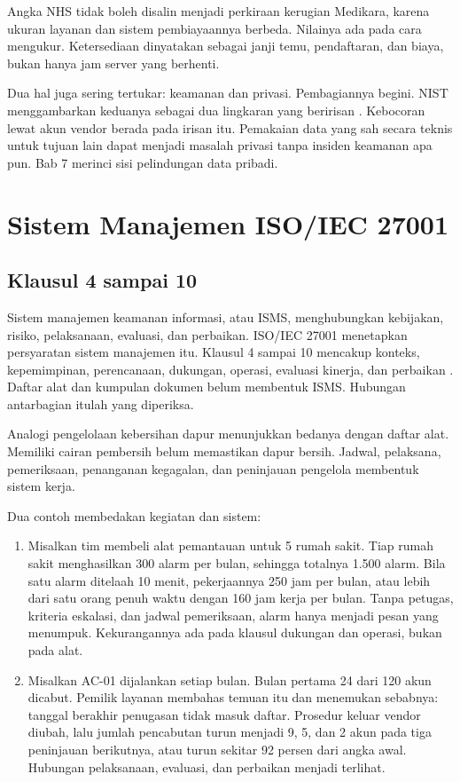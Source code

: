 Angka NHS tidak boleh disalin menjadi perkiraan kerugian Medikara, karena ukuran layanan dan sistem
pembiayaannya berbeda. Nilainya ada pada cara mengukur. Ketersediaan dinyatakan sebagai janji temu,
pendaftaran, dan biaya, bukan hanya jam server yang berhenti.

Dua hal juga sering tertukar: keamanan dan privasi. Pembagiannya begini. NIST menggambarkan
keduanya sebagai dua lingkaran yang beririsan \cite{nistcsf2}. Kebocoran lewat akun vendor berada
pada irisan itu. Pemakaian data yang sah secara teknis untuk tujuan lain dapat menjadi masalah
privasi tanpa insiden keamanan apa pun. Bab 7 merinci sisi pelindungan data pribadi.

\section{Sistem Manajemen ISO/IEC 27001}

\subsection*{Klausul 4 sampai 10}

Sistem manajemen keamanan informasi, atau ISMS, menghubungkan kebijakan, risiko, pelaksanaan,
evaluasi, dan perbaikan. ISO/IEC 27001 menetapkan persyaratan sistem manajemen itu. Klausul 4
sampai 10 mencakup konteks, kepemimpinan, perencanaan, dukungan, operasi, evaluasi kinerja, dan
perbaikan \cite{iso27001-2022}. Daftar alat dan kumpulan dokumen belum membentuk ISMS. Hubungan
antarbagian itulah yang diperiksa.

Analogi pengelolaan kebersihan dapur menunjukkan bedanya dengan daftar alat. Memiliki cairan
pembersih belum memastikan dapur bersih. Jadwal, pelaksana, pemeriksaan, penanganan kegagalan, dan
peninjauan pengelola membentuk sistem kerja.

Dua contoh membedakan kegiatan dan sistem:
\begin{enumerate}
  \item Misalkan tim membeli alat pemantauan untuk 5 rumah sakit. Tiap rumah sakit menghasilkan 300
  alarm per bulan, sehingga totalnya 1.500 alarm. Bila satu alarm ditelaah 10 menit, pekerjaannya
  250 jam per bulan, atau lebih dari satu orang penuh waktu dengan 160 jam kerja per bulan. Tanpa
  petugas, kriteria eskalasi, dan jadwal pemeriksaan, alarm hanya menjadi pesan yang menumpuk.
  Kekurangannya ada pada klausul dukungan dan operasi, bukan pada alat.
  \item Misalkan AC-01 dijalankan setiap bulan. Bulan pertama 24 dari 120 akun dicabut. Pemilik
  layanan membahas temuan itu dan menemukan sebabnya: tanggal berakhir penugasan tidak masuk
  daftar. Prosedur keluar vendor diubah, lalu jumlah pencabutan turun menjadi 9, 5, dan 2 akun pada
  tiga peninjauan berikutnya, atau turun sekitar 92 persen dari angka awal. Hubungan pelaksanaan,
  evaluasi, dan perbaikan menjadi terlihat.
\end{enumerate}

